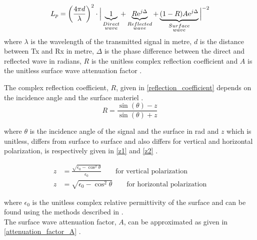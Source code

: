\begin{equation}
L_p=\left(\frac{4 \pi d}{\lambda}\right)^2 \cdot \Big|\underbrace{1}_{\begin{subarray}{c}Direct\\wave\end{subarray}}+\underbrace{R\text{e}^{j\Delta}}_{\begin{subarray}{c}Reflected\\wave\end{subarray}}+\underbrace{(1-R)A\text{e}^{j\Delta}}_{\begin{subarray}{c}Surface\\wave\end{subarray}}\Big|^{-2} 
\label{ground_wave}
\end{equation}
where
$\lambda$ is the wavelength of the transmitted signal in metre, $d$ is the distance between Tx and Rx in metre, $\Delta$ is the phase difference between the direct and reflected wave in radians, $R$ is the unitless complex reflection coefficient and $A$ is the unitless surface wave attenuation factor \cite{Chong,Bullington}. 


The complex reflection coefficient, $R$, given in \eqref{reflection_coefficient} depends on the incidence angle and the surface materiel \cite{Bullington}.
\begin{equation}
R = \frac{\sin(\theta)-z}{\sin(\theta)+z}
\label{reflection_coefficient}
\end{equation}

where $\theta$ is the incidence angle of the signal and the surface in rad and $z$ which is unitless, differs from surface to surface and also differs for vertical and horizontal polarization, is respectively given in \eqref{z1} and \eqref{z2} \cite{Bullington}.


\begin{align}
z &= \frac{\sqrt{\epsilon_{0}-\cos^{2}\theta}}{\epsilon_{0}} \qquad \text{for vertical polarization} \label{z1}\\
z &= \sqrt{\epsilon_{0}-\cos^{2}\theta}  \qquad \text{for horizontal polarization}
\label{z2}
\end{align}

where $\epsilon_{0}$ is the unitless complex relative permittivity of the surface and can be found using the methods described in \cite{Kim}.\\
The surface wave attenuation factor, $A$, can be approximated as given in \eqref{attenuation_factor_A} \cite{Chong, Bullington}. 



